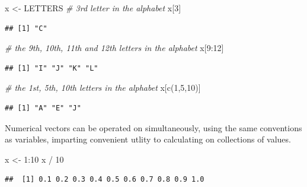 \documentclass[
]{book}
\newenvironment{Shaded}{\begin{snugshade}}{\end{snugshade}}
\newcommand{\CommentTok}[1]{\textcolor[rgb]{0.56,0.35,0.01}{\textit{#1}}}
\newcommand{\DecValTok}[1]{\textcolor[rgb]{0.00,0.00,0.81}{#1}}
\newcommand{\FunctionTok}[1]{\textcolor[rgb]{0.00,0.00,0.00}{#1}}
\newcommand{\NormalTok}[1]{#1}
\newcommand{\OtherTok}[1]{\textcolor[rgb]{0.56,0.35,0.01}{#1}}
\newcommand{\SpecialCharTok}[1]{\textcolor[rgb]{0.00,0.00,0.00}{#1}}
\begin{document}
\hfill\break

\begin{Shaded}
\begin{Highlighting}[]
\NormalTok{x }\OtherTok{\textless{}{-}}\NormalTok{ LETTERS}
\CommentTok{\# 3rd letter in the alphabet}
\NormalTok{x[}\DecValTok{3}\NormalTok{]}
\end{Highlighting}
\end{Shaded}

\begin{verbatim}
## [1] "C"
\end{verbatim}

\begin{Shaded}
\begin{Highlighting}[]
\CommentTok{\# the 9th, 10th, 11th and 12th letters in the alphabet}
\NormalTok{x[}\DecValTok{9}\SpecialCharTok{:}\DecValTok{12}\NormalTok{]}
\end{Highlighting}
\end{Shaded}

\begin{verbatim}
## [1] "I" "J" "K" "L"
\end{verbatim}

\begin{Shaded}
\begin{Highlighting}[]
\CommentTok{\# the 1st, 5th, 10th letters in the alphabet}
\NormalTok{x[}\FunctionTok{c}\NormalTok{(}\DecValTok{1}\NormalTok{,}\DecValTok{5}\NormalTok{,}\DecValTok{10}\NormalTok{)]}
\end{Highlighting}
\end{Shaded}

\begin{verbatim}
## [1] "A" "E" "J"
\end{verbatim}

Numerical vectors can be operated on simultaneously, using the same conventions as variables, imparting convenient utlity to calculating on collections of values.

\begin{Shaded}
\begin{Highlighting}[]
\NormalTok{x }\OtherTok{\textless{}{-}} \DecValTok{1}\SpecialCharTok{:}\DecValTok{10}
\NormalTok{x }\SpecialCharTok{/} \DecValTok{10}
\end{Highlighting}
\end{Shaded}

\begin{verbatim}
##  [1] 0.1 0.2 0.3 0.4 0.5 0.6 0.7 0.8 0.9 1.0
\end{verbatim}
\end{document}
